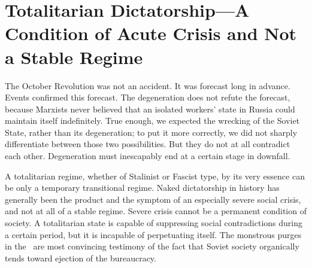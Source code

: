 \section*{Totalitarian Dictatorship---A Condition of Acute Crisis and Not a Stable Regime}

The October Revolution was not an accident. It was forecast long in advance. Events confirmed this forecast. The degeneration does not refute the forecast, because Marxists never believed that an isolated workers’ state in Russia could maintain itself indefinitely. True enough, we expected the wrecking of the Soviet State, rather than its degeneration; to put it more correctly, we did not sharply differentiate between those two possibilities. But they do not at all contradict each other. Degeneration must inescapably end at a certain stage in downfall.
\nowidow

A totalitarian regime, whether of Stalinist or Fascist type, by its very essence can be only a temporary transitional regime. Naked dictatorship in history has generally been the product and the symptom of an especially severe social crisis, and not at all of a stable regime. Severe crisis cannot be a permanent condition of society. A totalitarian state is capable of suppressing social contradictions during a certain period, but it is incapable of perpetuating itself. The monstrous purges in the \USSR\ are most convincing testimony of the fact that Soviet society organically tends toward ejection of the bureaucracy.

